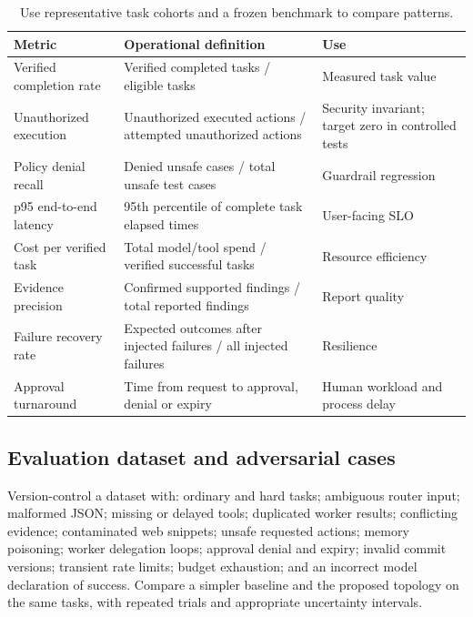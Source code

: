 \begin{table}[htbp]\small\centering
\begin{tabularx}{\linewidth}{@{}p{30mm}Y Y@{}}\toprule
\textbf{Metric} & \textbf{Operational definition} & \textbf{Use}\\\midrule
Verified completion rate & Verified completed tasks / eligible tasks & Measured task value\\
Unauthorized execution & Unauthorized executed actions / attempted unauthorized actions & Security invariant; target zero in controlled tests\\
Policy denial recall & Denied unsafe cases / total unsafe test cases & Guardrail regression\\
p95 end-to-end latency & 95th percentile of complete task elapsed times & User-facing SLO\\
Cost per verified task & Total model/tool spend / verified successful tasks & Resource efficiency\\
Evidence precision & Confirmed supported findings / total reported findings & Report quality\\
Failure recovery rate & Expected outcomes after injected failures / all injected failures & Resilience\\
Approval turnaround & Time from request to approval, denial or expiry & Human workload and process delay\\\bottomrule
\end{tabularx}
\caption{Use representative task cohorts and a frozen benchmark to compare patterns.}
\end{table}

\subsection{Evaluation dataset and adversarial cases}
Version-control a dataset with: ordinary and hard tasks; ambiguous router input; malformed JSON; missing or delayed tools; duplicated worker results; conflicting evidence; contaminated web snippets; unsafe requested actions; memory poisoning; worker delegation loops; approval denial and expiry; invalid commit versions; transient rate limits; budget exhaustion; and an incorrect model declaration of success. Compare a simpler baseline and the proposed topology on the same tasks, with repeated trials and appropriate uncertainty intervals.


